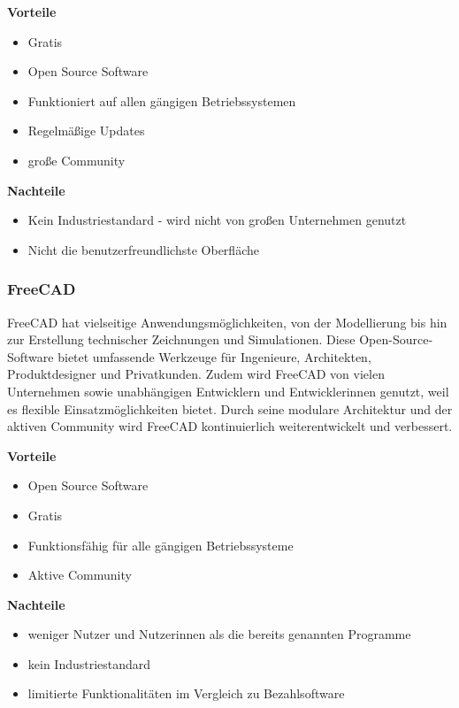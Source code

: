 \textbf{Vorteile}
\begin{itemize}
	\item Gratis 
	\item Open Source Software
	\item Funktioniert auf allen gängigen Betriebssystemen
	\item Regelmäßige Updates
	\item große Community
\end{itemize}

\textbf{Nachteile}
\begin{itemize}
	\item Kein Industriestandard - wird nicht von großen Unternehmen genutzt
	\item Nicht die benutzerfreundlichste Oberfläche
\end{itemize}
\cite{BlenderPros&Cons}


\subsubsection{FreeCAD}
FreeCAD hat vielseitige Anwendungsmöglichkeiten, von der Modellierung bis hin zur Erstellung technischer Zeichnungen und Simulationen. Diese Open-Source-Software bietet umfassende Werkzeuge für Ingenieure, Architekten, Produktdesigner und Privatkunden. Zudem wird FreeCAD von vielen Unternehmen sowie unabhängigen Entwicklern und Entwicklerinnen genutzt, weil es flexible Einsatzmöglichkeiten bietet. Durch seine modulare Architektur und der aktiven Community wird FreeCAD kontinuierlich weiterentwickelt und verbessert. \\
\cite{FreeCAD}  \cite{FreeCAD_2}

\textbf{Vorteile}
\begin{itemize}
	\item Open Source Software
	\item Gratis
	\item Funktionsfähig für alle gängigen Betriebssysteme
	\item Aktive Community	 
\end{itemize}

\textbf{Nachteile}
\begin{itemize}
	\item weniger Nutzer und Nutzerinnen als die bereits genannten Programme
	\item kein Industriestandard
	\item limitierte Funktionalitäten im Vergleich zu Bezahlsoftware
\end{itemize}
\cite{FreeCADReviews}

